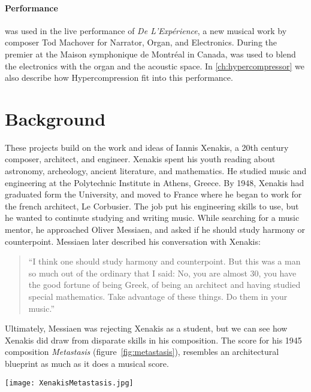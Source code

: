 \paragraph{Performance}
\thesis was used in the live performance of \textit{De
  L'Exp\'{e}rience}, a new musical work by composer Tod Machover for
Narrator, Organ, and Electronics. During the premier at the Maison
symphonique de Montr\'{e}al in Canada, \thesis was used to blend the
electronics with the organ and the acoustic space. In
\autoref{ch:hypercompressor} we also describe how Hypercompression fit
into this performance.

\section{Background}
\label{sec:background}
These projects build on the work and ideas of Iannis Xenakis, a 20th
century composer, architect, and engineer. Xenakis spent his youth
reading about astronomy, archeology, ancient literature, and
mathematics.\cite[]{Hoffmann2015} He studied music and engineering at
the Polytechnic Institute in Athens, Greece. By 1948, Xenakis had
graduated form the University, and moved to France where he began to
work for the french architect, Le Corbusier. The job put his
engineering skills to use, but he wanted to continute studying and
writing music.  While searching for a music mentor, he approached
Oliver Messiaen, and asked if he should study harmony or
counterpoint. Messiaen later described his conversation with Xenakis:
\begin{quotation}``I think one should study harmony and
  counterpoint. But this was a man so much out of the ordinary that I
  said: No, you are almost 30, you have the good fortune of being
  Greek, of being an architect and having studied special
  mathematics. Take advantage of these things. Do them in your
  music.''\cite{Service2013}
\end{quotation}
Ultimately, Messiaen was rejecting Xenakis as a student, but we can
see how Xenakis did draw from disparate skills in his composition. The
score for his 1945 composition \textit{Metastasis}
(figure~\ref{fig:metastasis}), resembles an architectural blueprint as
much as it does a musical score.

\begin{figure*}[h]
  \texttt{[image: XenakisMetastasis.jpg]}
  \caption{Excerpt from Iannis Xenakis' composition,
    \textit{Metastasis} (1954), measures 309-314. This score in this
    image was then transcribed to sheet music for the orchestral
    performance.}
  \label{fig:metastasis}
\end{figure*}


